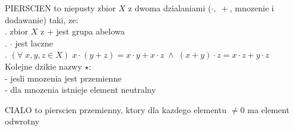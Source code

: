 \begin{multicols}{2}
    {\color{def}PIERSCIEN} to niepusty zbior $X$ z dwoma dzialaniami ($\cdot,\;+$, mnozenie i dodawanie) taki, ze:\smallskip\\
    . zbior $X$ z $+$ jest grupa abelowa\smallskip\\
    . $\cdot$ jest laczne\smallskip\\
    . $(\forall\;x,y,z\in X)\;x\cdot(y+z)=x\cdot y+x\cdot z\;\land\;(x+y)\cdot z=x\cdot z+y\cdot z$\smallskip\\
    Kolejne dzikie nazwy $\star$:\smallskip\\
     - jesli mnozenia jest przemienne\smallskip\\
     - dla mnozenia istnieje element neutralny\medskip

    {\color{def}CIALO} to pierscien przemienny, ktory dla kazdego elementu $\neq 0$ ma element odwrotny

\end{multicols}\bigskip

\bigskip

